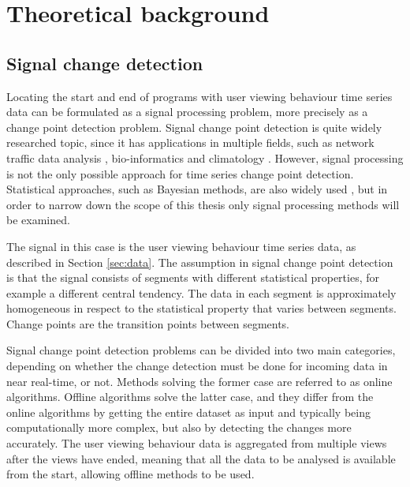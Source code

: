 \newpage
\section{Theoretical background} \label{sec:background}

\subsection{Signal change detection} \label{subsec:theory} %



Locating the start and end of programs with user viewing behaviour time series data can be formulated as a signal processing problem, more precisely as a change point detection problem. Signal change point detection is quite widely researched topic, since it has applications in multiple fields, such as network traffic data analysis \cite{levy-leducDetectionLocalizationChangepoints2009} \cite{lung-yut-fongDistributedDetectionLocalization2012}, bio-informatics \cite{liuChangepointDetectionMethod2018} \cite{vertFastDetectionMultiple2010} and climatology \cite{reevesReviewComparisonChangepoint2007} \cite{verbesseltDetectingTrendSeasonal2010a}. However, signal processing is not the only possible approach for time series change point detection. Statistical approaches, such as Bayesian methods, are also widely used \cite{barryBayesianAnalysisChange1993} \cite{rabinerTutorialHiddenMarkov1989}, but in order to narrow down the scope of this thesis only signal processing methods will be examined.

The signal in this case is the user viewing behaviour time series data, as described in Section \ref{sec:data}. The assumption in signal change point detection is that the signal consists of segments with different statistical properties, for example a different central tendency. The data in each segment is approximately homogeneous in respect to the statistical property that varies between segments. Change points are the transition points between segments.

Signal change point detection problems can be divided into two main categories, depending on whether the change detection must be done for incoming data in near real-time, or not. Methods solving the former case are referred to as online algorithms. Offline algorithms solve the latter case, and they differ from the online algorithms by getting the entire dataset as input and typically being computationally more complex, but also by detecting the changes more accurately. The user viewing behaviour data is aggregated from multiple views after the views have ended, meaning that all the data to be analysed is available from the start, allowing offline methods to be used.

